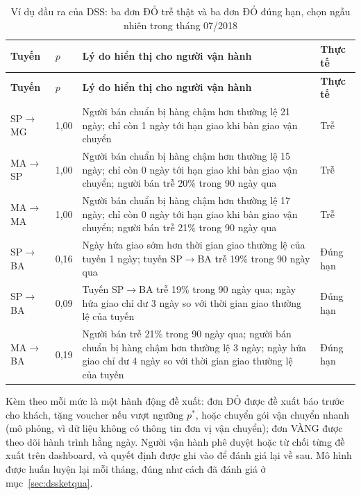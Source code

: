 \begingroup\small{}
\begin{longtable}{|P{1.6cm}|P{1.0cm}|>{\raggedright\arraybackslash}p{8.2cm}|P{1.6cm}|}
\caption{Ví dụ đầu ra của DSS: ba đơn ĐỎ trễ thật và ba đơn ĐỎ đúng hạn, chọn ngẫu nhiên trong tháng 07/2018}\label{tab:dssvidu}\\
\hline
\textbf{Tuyến} & \textbf{$p$} & \textbf{Lý do hiển thị cho người vận hành} & \textbf{Thực tế}\\ \hline \endfirsthead
\hline
\textbf{Tuyến} & \textbf{$p$} & \textbf{Lý do hiển thị cho người vận hành} & \textbf{Thực tế}\\ \hline \endhead
SP$\rightarrow$MG & 1,00 & Người bán chuẩn bị hàng chậm hơn thường lệ 21 ngày; chỉ còn 1 ngày tới hạn giao khi bàn giao vận chuyển & Trễ\\ \hline
MA$\rightarrow$SP & 1,00 & Người bán chuẩn bị hàng chậm hơn thường lệ 15 ngày; chỉ còn 0 ngày tới hạn giao khi bàn giao vận chuyển; người bán trễ 20\% trong 90 ngày qua & Trễ\\ \hline
MA$\rightarrow$MA & 1,00 & Người bán chuẩn bị hàng chậm hơn thường lệ 17 ngày; chỉ còn 0 ngày tới hạn giao khi bàn giao vận chuyển; người bán trễ 21\% trong 90 ngày qua & Trễ\\ \hline
SP$\rightarrow$BA & 0,16 & Ngày hứa giao sớm hơn thời gian giao thường lệ của tuyến 1 ngày; tuyến SP$\rightarrow$BA trễ 19\% trong 90 ngày qua & Đúng hạn\\ \hline
SP$\rightarrow$BA & 0,09 & Tuyến SP$\rightarrow$BA trễ 19\% trong 90 ngày qua; ngày hứa giao chỉ dư 3 ngày so với thời gian giao thường lệ của tuyến & Đúng hạn\\ \hline
MA$\rightarrow$BA & 0,19 & Người bán trễ 21\% trong 90 ngày qua; người bán chuẩn bị hàng chậm hơn thường lệ 3 ngày; ngày hứa giao chỉ dư 4 ngày so với thời gian giao thường lệ của tuyến & Đúng hạn\\ \hline
\end{longtable}
\endgroup

Kèm theo mỗi mức là một hành động đề xuất: đơn ĐỎ được đề xuất báo trước cho khách, tặng voucher nếu vượt ngưỡng $p^{*}$, hoặc chuyển gói vận chuyển nhanh (mô phỏng, vì dữ liệu không có thông tin đơn vị vận chuyển); đơn VÀNG được theo dõi hành trình hằng ngày. Người vận hành phê duyệt hoặc từ chối từng đề xuất trên dashboard, và quyết định được ghi vào  để đánh giá lại về sau. Mô hình được huấn luyện lại mỗi tháng, đúng như cách đã đánh giá ở mục~\ref{sec:dssketqua}.

